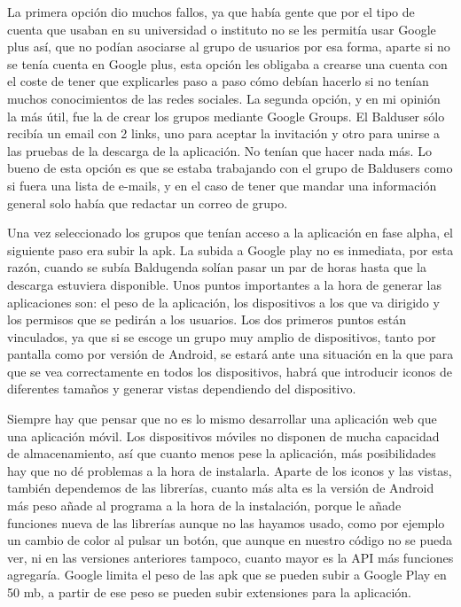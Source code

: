 La primera opción dio muchos fallos, ya que había gente que por el tipo de cuenta que usaban en su universidad o instituto no se les permitía usar Google plus así, que no podían asociarse al grupo de usuarios por esa forma, aparte si no se tenía cuenta en Google plus, esta opción les obligaba a crearse una cuenta con el coste de tener que explicarles paso a paso cómo debían hacerlo si no tenían muchos conocimientos de las redes sociales.
La segunda opción, y en mi opinión la más útil, fue la de crear los grupos mediante Google Groups. El Balduser sólo recibía un email con 2 links, uno para aceptar la invitación y otro para unirse a las pruebas de la descarga de la aplicación. No tenían que hacer nada más. Lo bueno de esta opción es que se estaba trabajando con el grupo de Baldusers como si fuera una lista de e-mails, y en el caso de tener que mandar una información general solo había que redactar un correo de grupo.

Una vez seleccionado los grupos que tenían acceso a la aplicación en fase alpha, el siguiente paso era subir la apk.
La subida a Google play no es inmediata, por esta razón, cuando se subía Baldugenda solían pasar un par de horas hasta que la descarga estuviera disponible.
Unos puntos importantes a la hora de generar las aplicaciones son: el peso de la aplicación, los dispositivos a los que va dirigido y los permisos que se pedirán a los usuarios.
Los dos primeros puntos están vinculados, ya que si se escoge un grupo muy amplio de dispositivos, tanto por pantalla como por versión de Android, se estará ante una situación en la que para que se vea correctamente en todos los dispositivos, habrá que introducir iconos de diferentes tamaños y generar vistas dependiendo del dispositivo.

Siempre hay que pensar que no es lo mismo desarrollar una aplicación web que una aplicación móvil. Los dispositivos móviles no disponen de mucha capacidad de almacenamiento, así que cuanto menos pese la aplicación, más posibilidades hay que no dé problemas a la hora de instalarla.
Aparte de los iconos y las vistas, también dependemos de las librerías, cuanto más alta es la versión de Android más peso añade al programa a la hora de la instalación, porque le añade funciones nueva de las librerías aunque no las hayamos usado, como por ejemplo un cambio de color al pulsar un botón, que aunque en nuestro código no se pueda ver, ni en las versiones anteriores tampoco, cuanto mayor es la API más funciones agregaría.
Google limita el peso de las apk que se pueden subir a Google Play en 50 mb, a partir de ese peso se pueden subir extensiones para la aplicación.

